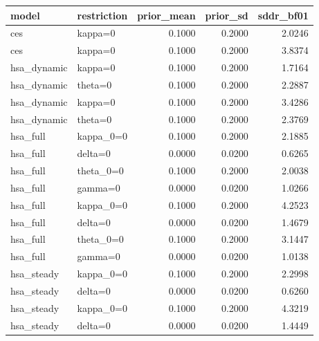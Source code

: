 \begin{tabular}{llrrr}
\toprule
model & restriction & prior\_mean & prior\_sd & sddr\_bf01 \\
\midrule
ces & kappa=0 & 0.1000 & 0.2000 & 2.0246 \\
ces & kappa=0 & 0.1000 & 0.2000 & 3.8374 \\
hsa\_dynamic & kappa=0 & 0.1000 & 0.2000 & 1.7164 \\
hsa\_dynamic & theta=0 & 0.1000 & 0.2000 & 2.2887 \\
hsa\_dynamic & kappa=0 & 0.1000 & 0.2000 & 3.4286 \\
hsa\_dynamic & theta=0 & 0.1000 & 0.2000 & 2.3769 \\
hsa\_full & kappa\_0=0 & 0.1000 & 0.2000 & 2.1885 \\
hsa\_full & delta=0 & 0.0000 & 0.0200 & 0.6265 \\
hsa\_full & theta\_0=0 & 0.1000 & 0.2000 & 2.0038 \\
hsa\_full & gamma=0 & 0.0000 & 0.0200 & 1.0266 \\
hsa\_full & kappa\_0=0 & 0.1000 & 0.2000 & 4.2523 \\
hsa\_full & delta=0 & 0.0000 & 0.0200 & 1.4679 \\
hsa\_full & theta\_0=0 & 0.1000 & 0.2000 & 3.1447 \\
hsa\_full & gamma=0 & 0.0000 & 0.0200 & 1.0138 \\
hsa\_steady & kappa\_0=0 & 0.1000 & 0.2000 & 2.2998 \\
hsa\_steady & delta=0 & 0.0000 & 0.0200 & 0.6260 \\
hsa\_steady & kappa\_0=0 & 0.1000 & 0.2000 & 4.3219 \\
hsa\_steady & delta=0 & 0.0000 & 0.0200 & 1.4449 \\
\bottomrule
\end{tabular}
